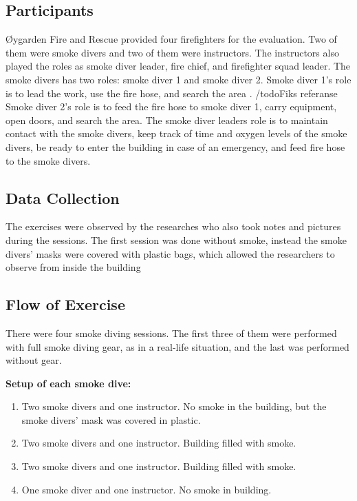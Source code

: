 \documentclass[../Main/thesis.tex]{subfiles}
\begin{document}
\subsection{Participants}
Øygarden Fire and Rescue provided four firefighters for the evaluation.
Two of them were smoke divers and two of them were instructors.
The instructors also played the roles as smoke diver leader, fire chief, and firefighter squad leader.
The smoke divers has two roles: smoke diver 1 and smoke diver 2.
Smoke diver 1's role is to lead the work, use the fire hose, and search the area \citep{Direktoratetforsamfunnssikkerhetogberedskap1994}. /todo{Fiks referanse}
Smoke diver 2's role is to feed the fire hose to smoke diver 1, carry equipment, open doors, and search the area.%
The smoke diver leaders role is to maintain contact with the smoke divers, keep track of time and oxygen levels of the smoke divers, be ready to enter the building in case of an emergency, and feed fire hose to the smoke divers.

\subsection{Data Collection}
The exercises were observed by the researches who also took notes and pictures during the sessions. 
The first session was done without smoke, instead the smoke divers' masks were covered with plastic bags, which allowed the researchers to observe from inside the building

\subsection{Flow of Exercise}
There were four smoke diving sessions.
The first three of them were performed with full smoke diving gear, as in a real-life situation, and the last was performed without gear.

\textbf{Setup of each smoke dive:}
\begin{enumerate}
	\item Two smoke divers and one instructor. No smoke in the building, but the smoke divers' mask was covered in plastic.
	\item Two smoke divers and one instructor. Building filled with smoke.
	\item Two smoke divers and one instructor. Building filled with smoke.
	\item One smoke diver and one instructor. No smoke in building.
\end{enumerate}
\end{document}

